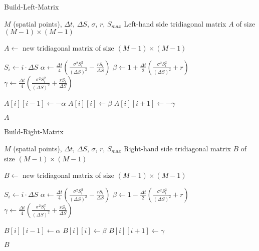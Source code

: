\documentclass[12pt,a4paper]{article}
\numberwithin{algorithm}{subsection}
\begin{document}
\begin{algorithm}[H]
\caption{Build-Left-Matrix}
\begin{algorithmic}[1]
\REQUIRE $M$ (spatial points), $\Delta t$, $\Delta S$, $\sigma$, $r$, $S_{max}$
\ENSURE Left-hand side tridiagonal matrix $A$ of size $(M-1) \times (M-1)$

\STATE $A \leftarrow$ new tridiagonal matrix of size $(M-1) \times (M-1)$

    \STATE $S_i \leftarrow i \cdot \Delta S$
    \STATE $\alpha \leftarrow \frac{\Delta t}{4} \left( \frac{\sigma^2 S_i^2}{(\Delta S)^2} - \frac{rS_i}{\Delta S} \right)$
    \STATE $\beta \leftarrow 1 + \frac{\Delta t}{2} \left( \frac{\sigma^2 S_i^2}{(\Delta S)^2} + r \right)$
    \STATE $\gamma \leftarrow \frac{\Delta t}{4} \left( \frac{\sigma^2 S_i^2}{(\Delta S)^2} + \frac{rS_i}{\Delta S} \right)$
    
        \STATE $A[i][i-1] \leftarrow -\alpha$ 
    \ENDIF
    \STATE $A[i][i] \leftarrow \beta$ 
        \STATE $A[i][i+1] \leftarrow -\gamma$ 
    \ENDIF
\ENDFOR

\RETURN $A$
\end{algorithmic}
\end{algorithm}

\begin{algorithm}[H]
\caption{Build-Right-Matrix}
\begin{algorithmic}[1]
\REQUIRE $M$ (spatial points), $\Delta t$, $\Delta S$, $\sigma$, $r$, $S_{max}$
\ENSURE Right-hand side tridiagonal matrix $B$ of size $(M-1) \times (M-1)$

\STATE $B \leftarrow$ new tridiagonal matrix of size $(M-1) \times (M-1)$

    \STATE $S_i \leftarrow i \cdot \Delta S$
    \STATE $\alpha \leftarrow \frac{\Delta t}{4} \left( \frac{\sigma^2 S_i^2}{(\Delta S)^2} - \frac{rS_i}{\Delta S} \right)$
    \STATE $\beta \leftarrow 1 - \frac{\Delta t}{2} \left( \frac{\sigma^2 S_i^2}{(\Delta S)^2} + r \right)$
    \STATE $\gamma \leftarrow \frac{\Delta t}{4} \left( \frac{\sigma^2 S_i^2}{(\Delta S)^2} + \frac{rS_i}{\Delta S} \right)$
    
        \STATE $B[i][i-1] \leftarrow \alpha$ 
    \ENDIF
    \STATE $B[i][i] \leftarrow \beta$ 
        \STATE $B[i][i+1] \leftarrow \gamma$ 
    \ENDIF
\ENDFOR

\RETURN $B$
\end{algorithmic}
\end{algorithm}
\end{document}

